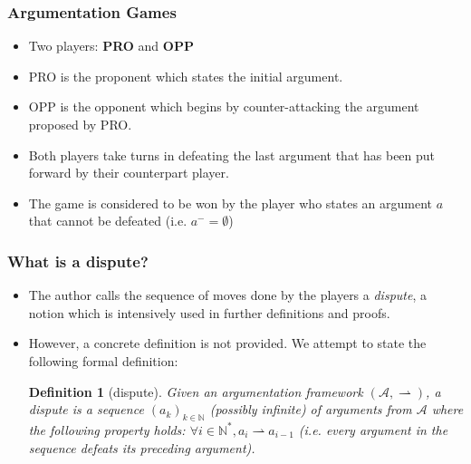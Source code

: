 \documentclass{beamer}
\newtheorem{Def}{Definition}[subsection]
\newcommand{\df}{\ensuremath{\rightharpoonup}}
\begin{document}
\begin{frame}
	\frametitle{Argumentation Games}
	\begin{itemize}
		\item Two players: \textbf{PRO} and \textbf{OPP} \pause

		\item PRO is the proponent which states the initial argument. \pause
		\item OPP is the opponent which begins by counter-attacking the argument proposed by PRO.\pause
		\item Both players take turns in defeating the last argument that has been put forward by their counterpart player.\pause
		\item The game is considered to be won by the player who states an argument $a$ that cannot be defeated (i.e. $a^{-} = \emptyset$)
	\end{itemize}
\end{frame}

\begin{frame}
	\frametitle{What is a dispute?}
	\begin{itemize}
		\item The author calls the sequence of moves done by the players a \emph{dispute}, a notion which is intensively used in further definitions and proofs. \pause
		\item However, a concrete definition is not provided. We attempt to state the following formal definition: \pause
		\begin{Def}[dispute]
			Given an argumentation framework $(\mathcal{A}, \df)$, a dispute is a sequence $(a_{k})_{k \in \mathbb{N}}$ (possibly infinite) of arguments from $\mathcal{A}$ where the following property holds: $\forall i \in \mathbb{N^*},  a_{i} \df a_{i-1}$ (i.e. every argument in the sequence defeats its preceding argument).
		\end{Def}
	\end{itemize}
\end{frame}
\end{document}

